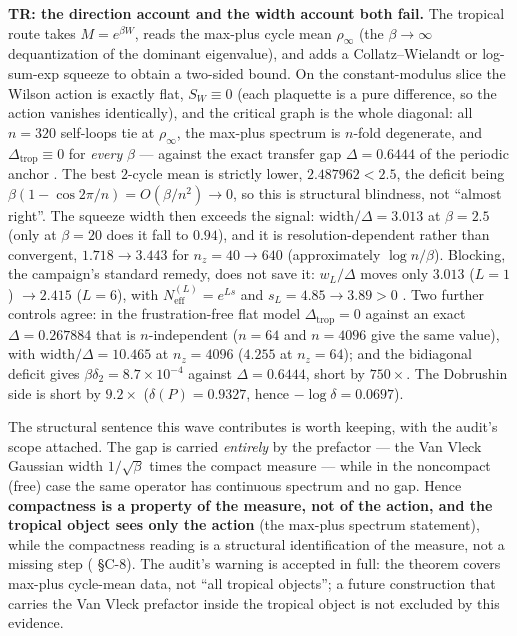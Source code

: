 \textbf{TR: the direction account and the width account both fail.} The tropical route takes
$M=e^{\beta W}$, reads the max-plus cycle mean $\rho_\infty$ (the $\beta\to\infty$ dequantization
of the dominant eigenvalue), and adds a Collatz--Wielandt or log-sum-exp squeeze to obtain a
two-sided bound. On the constant-modulus slice the Wilson action is exactly flat, $S_W\equiv0$
(each plaquette is a pure difference, so the action vanishes identically), and the critical graph
is the whole diagonal: all $n=320$ self-loops tie at $\rho_\infty$, the max-plus spectrum is
$n$-fold degenerate, and $\Delta_{\mathrm{trop}}\equiv0$ for \emph{every} $\beta$ --- against the
exact transfer gap $\Delta=0.6444$ of the periodic anchor \LN. The best $2$-cycle mean is strictly
lower, $2.487962<2.5$, the deficit being $\beta(1-\cos 2\pi/n)=O(\beta/n^2)\to0$, so this is
structural blindness, not ``almost right''.
The squeeze width then exceeds the signal: $\mathrm{width}/\Delta=3.013$ at $\beta=2.5$ (only at
$\beta=20$ does it fall to $0.94$), and it is resolution-dependent rather than convergent,
$1.718\to3.443$ for $n_z=40\to640$ (approximately $\log n/\beta$). Blocking, the campaign's
standard remedy, does not save it: $w_L/\Delta$ moves only $3.013$ ($L=1$) $\to2.415$ ($L=6$), with
$N_{\mathrm{eff}}^{(L)}=e^{Ls}$ and $s_L=4.85\to3.89>0$ \LN. Two further controls agree: in the
frustration-free flat model $\Delta_{\mathrm{trop}}=0$ against an exact $\Delta=0.267884$ that is
$n$-independent ($n=64$ and $n=4096$ give the same value), with $\mathrm{width}/\Delta=10.465$ at
$n_z=4096$ ($4.255$ at $n_z=64$); and
the bidiagonal deficit gives $\beta\delta_2=8.7\times10^{-4}$ against $\Delta=0.6444$, short by
$750\times$. The Dobrushin side is short by $9.2\times$ ($\delta(P)=0.9327$, hence
$-\log\delta=0.0697$).

The structural sentence this wave contributes is worth keeping, with the audit's scope attached.
The gap is carried \emph{entirely} by the prefactor --- the Van Vleck Gaussian width $1/\sqrt\beta$
times the compact measure --- while in the noncompact (free) case the same operator has continuous
spectrum and no gap. Hence \textbf{compactness is a property of the measure, not of the action, and
the tropical object sees only the action} \LT{} (the max-plus spectrum statement), while the
compactness reading is a structural identification of the measure, not a missing step \LC{}
( \S C-8). The audit's warning is accepted in full: the
theorem covers max-plus cycle-mean data, not ``all tropical objects''; a future construction that
carries the Van Vleck prefactor inside the tropical object is not excluded by this evidence.

